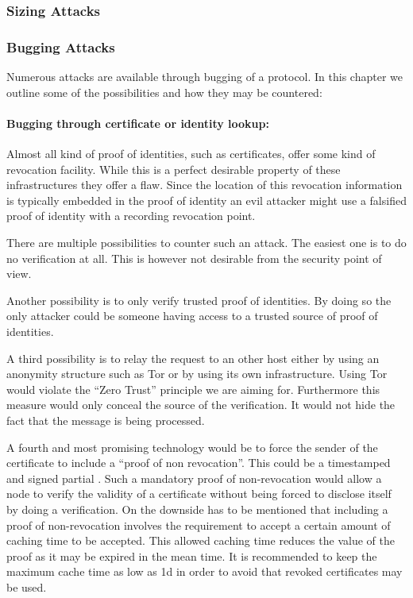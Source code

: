 \subsubsection{Sizing Attacks}

\subsubsection{Bugging Attacks}
Numerous attacks are available through bugging of a protocol. In this chapter we outline some of the possibilities and how they may be countered:

\paragraph{Bugging through certificate or identity lookup:} Almost all kind of proof of identities, such as certificates, offer some kind of revocation facility. While this is a perfect desirable property of these infrastructures they offer a flaw. Since the location of this revocation information is typically embedded in the proof of identity an evil attacker might use a falsified proof of identity with a recording revocation point.
	      
There are multiple possibilities to counter such an attack. The easiest one is to do no verification at all. This is however not desirable from the security point of view. 

Another possibility is to only verify trusted proof of identities. By doing so the only attacker could be someone having access to a trusted source of proof of identities. 

A third possibility is to relay the request to an other host either by using an anonymity structure such as Tor or by using its own infrastructure. Using Tor would violate the ``Zero Trust'' principle we are aiming for. Furthermore this measure would only conceal the source of the verification. It would not hide the fact that the message is being processed. 

A fourth and most promising technology would be to force the sender of the certificate to include a ``proof of non revocation''. This could be a timestamped and signed partial . Such a mandatory proof of non-revocation would allow a node to verify the validity of a certificate without being forced to disclose itself by doing a verification. On the downside has to be mentioned that including a proof of non-revocation involves the requirement to accept a certain amount of caching time to be accepted. This allowed caching time reduces the value of the proof as it may be expired in the mean time. It is recommended to keep the maximum cache time as low as 1d in order to avoid that revoked certificates may be used. 

